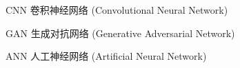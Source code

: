 \begin{denotation}[3cm]
\item[CNN] 卷积神经网络 (Convolutional Neural Network)
\item[GAN] 生成对抗网络 (Generative Adversarial Network)
\item[ANN] 人工神经网络 (Artificial Neural Network)
\end{denotation}
